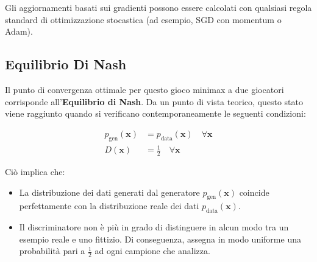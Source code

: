 ﻿\documentclass[11pt, a4paper]{article}
\begin{document}
\begin{algorithm}[H]
\caption{Addestramento stocastico a minibatch delle reti generative avversarie.}
\end{algorithm}

Gli aggiornamenti basati sui gradienti possono essere calcolati con qualsiasi regola standard di ottimizzazione stocastica (ad esempio, SGD con momentum o Adam).

\subsection{Equilibrio Di Nash}

Il punto di convergenza ottimale per questo gioco minimax a due giocatori corrisponde all'\textbf{Equilibrio di Nash}. Da un punto di vista teorico, questo stato viene raggiunto quando si verificano contemporaneamente le seguenti condizioni:

\begin{align*}
p_{\text{gen}}(\bm{x}) &= p_{\text{data}}(\bm{x}) \quad \forall \bm{x} \\
D(\bm{x}) &= \frac{1}{2} \quad \forall \bm{x}
\end{align*}

Ciò implica che:
\begin{itemize}
    \item La distribuzione dei dati generati dal generatore $p_{\text{gen}}(\bm{x})$ coincide perfettamente con la distribuzione reale dei dati $p_{\text{data}}(\bm{x})$.
    \item Il discriminatore non è più in grado di distinguere in alcun modo tra un esempio reale e uno fittizio. Di conseguenza, assegna in modo uniforme una probabilità pari a $\frac{1}{2}$ ad ogni campione che analizza.
\end{itemize}

\end{document}

